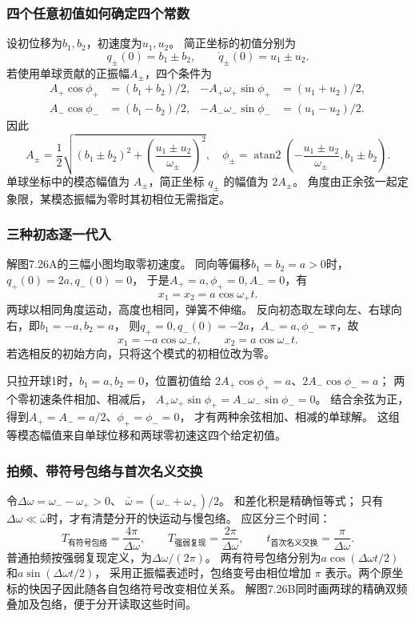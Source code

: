 \documentclass[UTF8,fontset=fandol,a4paper,11pt]{ctexart}
\begin{document}
\subsubsection*{四个任意初值如何确定四个常数}
设初位移为$b_1,b_2$，初速度为$u_1,u_2$。
简正坐标的初值分别为
\[
q_\pm(0)=b_1\pm b_2,\qquad
\dot q_\pm(0)=u_1\pm u_2.
\]
若使用单球贡献的正振幅$A_\pm$，四个条件为
\[
\begin{aligned}
A_+\cos\phi_+&=(b_1+b_2)/2,&
-A_+\omega_+\sin\phi_+&=(u_1+u_2)/2,\\
A_-\cos\phi_-&=(b_1-b_2)/2,&
-A_-\omega_-\sin\phi_-&=(u_1-u_2)/2.
\end{aligned}
\]
因此
\[
A_\pm=\frac12\sqrt{(b_1\pm b_2)^2+
\left(\frac{u_1\pm u_2}{\omega_\pm}\right)^2},
\quad
\phi_\pm=\operatorname{atan2}\left(-\frac{u_1\pm u_2}{\omega_\pm},b_1\pm b_2\right).
\]
单球坐标中的模态幅值为 $A_\pm$，简正坐标 $q_\pm$ 的幅值为 $2A_\pm$。
角度由正余弦一起定象限，某模态振幅为零时其初相位无需指定。

\subsubsection*{三种初态逐一代入}
解图7.26A的三幅小图均取零初速度。
同向等偏移$b_1=b_2=a>0$时，$q_+(0)=2a,q_-(0)=0$，
于是$A_+=a,\phi_+=0,A_-=0$，有
\[
x_1=x_2=a\cos\omega_+t.
\]
两球以相同角度运动，高度也相同，弹簧不伸缩。
反向初态取左球向左、右球向右，即$b_1=-a,b_2=a$，
则$q_+=0,q_-(0)=-2a$，$A_-=a,\phi_-=\pi$，故
\[
x_1=-a\cos\omega_-t,\qquad x_2=a\cos\omega_-t.
\]
若选相反的初始方向，只将这个模式的初相位改为零。

只拉开球1时，$b_1=a,b_2=0$，位置初值给
$2A_+\cos\phi_+=a$、$2A_-\cos\phi_-=a$；
两个零初速条件相加、相减后，
$A_+\omega_+\sin\phi_+=A_-\omega_-\sin\phi_-=0$。
结合余弦为正，得到$A_+=A_-=a/2$、$\phi_+=\phi_-=0$，
才有两种余弦相加、相减的单球解。
这组等模态幅值来自单球位移和两球零初速这四个给定初值。

\subsubsection*{拍频、带符号包络与首次名义交换}
令$\Delta\omega=\omega_--\omega_+>0$、
$\bar\omega=(\omega_-+\omega_+)/2$。
和差化积是精确恒等式；
只有$\Delta\omega\ll\bar\omega$时，才有清楚分开的快运动与慢包络。
应区分三个时间：
\[
T_{\text{有符号包络}}=\frac{4\pi}{\Delta\omega},\qquad
T_{\text{强弱复现}}=\frac{2\pi}{\Delta\omega},\qquad
t_{\text{首次名义交换}}=\frac{\pi}{\Delta\omega}.
\]
普通拍频按强弱复现定义，为$\Delta\omega/(2\pi)$。
两有符号包络分别为$a\cos(\Delta\omega t/2)$和$a\sin(\Delta\omega t/2)$，
采用正振幅表述时，包络变号由相位增加 $\pi$ 表示。两个原坐标的快因子因此随各自包络符号改变相位关系。
解图7.26B同时画两球的精确双频叠加及包络，便于分开读取这些时间。
\end{document}
